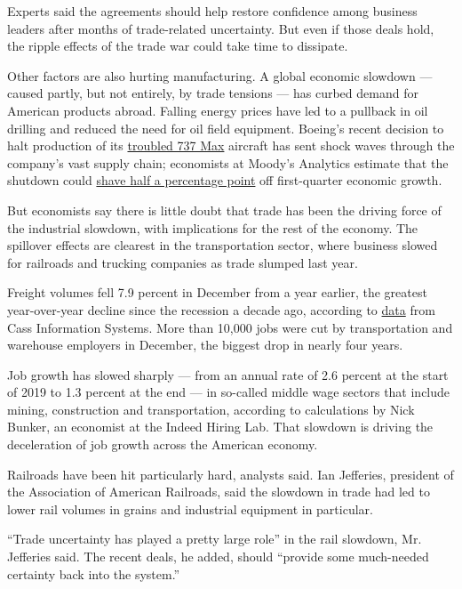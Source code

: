 Experts said the agreements should help restore confidence among
business leaders after months of trade-related uncertainty. But even if
those deals hold, the ripple effects of the trade war could take time to
dissipate.

Other factors are also hurting manufacturing. A global economic slowdown
--- caused partly, but not entirely, by trade tensions --- has curbed
demand for American products abroad. Falling energy prices have led to a
pullback in oil drilling and reduced the need for oil field equipment.
Boeing's recent decision to halt production of its
\href{https://www.nytimes3xbfgragh.onion/2019/12/16/business/boeing-737-max.html}{troubled
737 Max} aircraft has sent shock waves through the company's vast supply
chain; economists at Moody's Analytics estimate that the shutdown could
\href{https://www.economy.com/dismal/analysis/todays-economy/377567/Boeings-737-Max-Issues-Will-Ding-Q1-GDP/}{shave
half a percentage point} off first-quarter economic growth.

But economists say there is little doubt that trade has been the driving
force of the industrial slowdown, with implications for the rest of the
economy. The spillover effects are clearest in the transportation
sector, where business slowed for railroads and trucking companies as
trade slumped last year.

Freight volumes fell 7.9 percent in December from a year earlier, the
greatest year-over-year decline since the recession a decade ago,
according to
\href{https://www.cassinfo.com/freight-audit-payment/cass-transportation-indexes/december-2019}{data}
from Cass Information Systems. More than 10,000 jobs were cut by
transportation and warehouse employers in December, the biggest drop in
nearly four years.

Job growth has slowed sharply --- from an annual rate of 2.6 percent at
the start of 2019 to 1.3 percent at the end --- in so-called middle wage
sectors that include mining, construction and transportation, according
to calculations by Nick Bunker, an economist at the Indeed Hiring Lab.
That slowdown is driving the deceleration of job growth across the
American economy.

Railroads have been hit particularly hard, analysts said. Ian Jefferies,
president of the Association of American Railroads, said the slowdown in
trade had led to lower rail volumes in grains and industrial equipment
in particular.

``Trade uncertainty has played a pretty large role'' in the rail
slowdown, Mr. Jefferies said. The recent deals, he added, should
``provide some much-needed certainty back into the system.''


